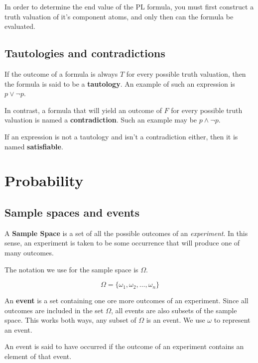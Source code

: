 
In order to determine the end value of the PL formula, you must first construct
a truth valuation of it's component atoms, and only then can the formula be
evaluated.

\subsection{Tautologies and contradictions}

If the outcome of a formula is always $T$ for every possible truth valuation,
then the formula is said to be a {\bf tautology}. An example of such an
expression is $p \vee \neg p$.

In contrast, a formula that will yield an outcome of $F$ for every possible
truth valuation is named a {\bf contradiction}. Such an example may be $p \wedge
\neg p$.

If an expression is not a tautology and isn't a contradiction either, then it is
named {\bf satisfiable}.


\section{Probability}

\subsection{Sample spaces and events}

A {\bf Sample Space} is a set of all the possible outcomes of an {\it
experiment}. In this sense, an experiment is taken to be some occurrence that
will produce one of many outcomes.

The notation we use for the sample space is $\Omega$.

\begin{dmath}
	\Omega = \{\omega_1, \omega_2, \ldots, \omega_n\}
\end{dmath}

An {\bf event} is a set containing one ore more outcomes of an experiment. Since
all outcomes are included in the set $\Omega$, all events are also subsets of
the sample space. This works both ways, any subset of $\Omega$ is an event. We
use $\omega$ to represent an event.

An event is said to have occurred if the outcome of an experiment contains an
element of that event.

